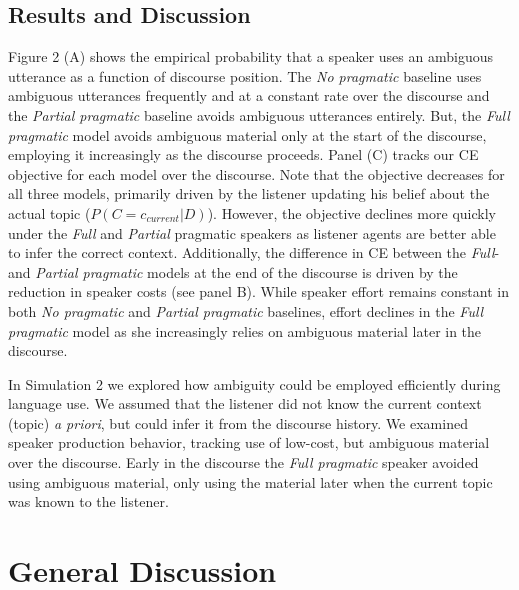 \documentclass[10pt, letterpaper]{article}
\begin{document}
\subsection{Results and Discussion}\label{results-and-discussion-1}

Figure 2 (A) shows the empirical probability that a speaker uses an
ambiguous utterance as a function of discourse position. The
\textit{No pragmatic} baseline uses ambiguous utterances frequently and
at a constant rate over the discourse and the \textit{Partial pragmatic}
baseline avoids ambiguous utterances entirely. But, the
\textit{Full pragmatic} model avoids ambiguous material only at the
start of the discourse, employing it increasingly as the discourse
proceeds. Panel (C) tracks our CE objective for each model over the
discourse. Note that the objective decreases for all three models,
primarily driven by the listener updating his belief about the actual
topic (\(P(C=c_{current}|D)\)). However, the objective declines more
quickly under the \textit{Full} and \textit{Partial} pragmatic speakers
as listener agents are better able to infer the correct context.
Additionally, the difference in CE between the \textit{Full}- and
\textit{Partial pragmatic} models at the end of the discourse is driven
by the reduction in speaker costs (see panel B). While speaker effort
remains constant in both \textit{No pragmatic} and
\textit{Partial pragmatic} baselines, effort declines in the
\textit{Full pragmatic} model as she increasingly relies on ambiguous
material later in the discourse.\par

In Simulation 2 we explored how ambiguity could be employed efficiently
during language use. We assumed that the listener did not know the
current context (topic) \textit{a priori}, but could infer it from the
discourse history. We examined speaker production behavior, tracking use
of low-cost, but ambiguous material over the discourse. Early in the
discourse the \textit{Full pragmatic} speaker avoided using ambiguous
material, only using the material later when the current topic was known
to the listener.

\section{General Discussion}\label{general-discussion}
\end{document}
